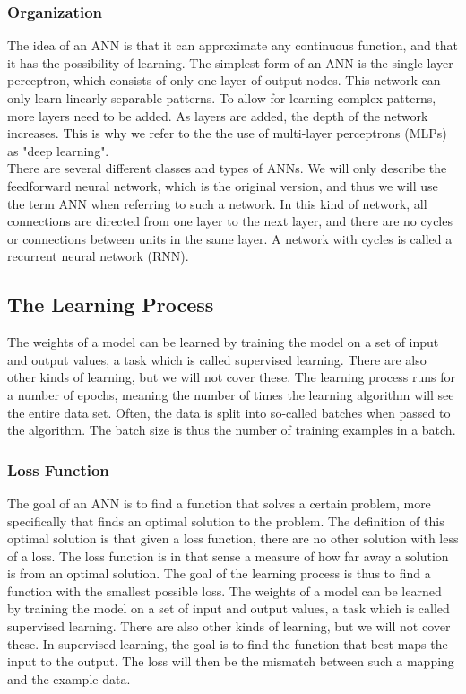 \subsubsection{Organization}

\noindent The idea of an ANN is that it can approximate any continuous function, and that it has the possibility of learning. The simplest form of an ANN is the single layer perceptron, which consists of only one layer of output nodes. This network can only learn linearly separable patterns. To allow for learning complex patterns, more layers need to be added. As layers are added, the depth of the network increases. This is why we refer to the the use of multi-layer perceptrons (MLPs) as "deep learning". \\

\noindent There are several different classes and types of ANNs. We will only describe the feedforward neural network, which is the original version, and thus we will use the term ANN when referring to such a network. In this kind of network, all connections are directed from one layer to the next layer, and there are no cycles or connections between units in the same layer. A network with cycles is called a recurrent neural network (RNN).

\subsection{The Learning Process}

The weights of a model can be learned by training the model on a set of input and output values, a task which is called supervised learning. There are also other kinds of learning, but we will not cover these. The learning process runs for a number of epochs, meaning the number of times the learning algorithm will see the entire data set. Often, the data is split into so-called batches when passed to the algorithm. The batch size is thus the number of training examples in a batch.

\subsubsection{Loss Function}

\noindent The goal of an ANN is to find a function that solves a certain problem, more specifically that finds an optimal solution to the problem. The definition of this optimal solution is that given a loss function, there are no other solution with less of a loss. The loss function is in that sense a measure of how far away a solution is from an optimal solution. The goal of the learning process is thus to find a function with the smallest possible loss. The weights of a model can be learned by training the model on a set of input and output values, a task which is called supervised learning. There are also other kinds of learning, but we will not cover these. In supervised learning, the goal is to find the function that best maps the input to the output. The loss will then be the mismatch between such a mapping and the example data. \\ 

